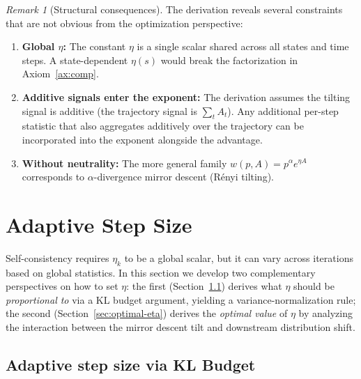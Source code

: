 \documentclass{article}
\theoremstyle{plain}
\theoremstyle{definition}
\theoremstyle{remark}
\newtheorem{remark}[theorem]{Remark}
\begin{document}
\begin{remark}[Structural consequences]
The derivation reveals several constraints that are not obvious from the optimization perspective:
\begin{enumerate}[label=(\roman*)]
  \item \textbf{Global $\eta$:} The constant $\eta$ is a single scalar shared across all states and time steps. A state-dependent $\eta(s)$ would break the factorization in Axiom~\ref{ax:comp}.
  \item \textbf{Additive signals enter the exponent:} The derivation assumes the tilting signal is additive (the trajectory signal is $\sum_t A_t$). Any additional per-step statistic that also aggregates additively over the trajectory can be incorporated into the exponent alongside the advantage.
  \item \textbf{Without neutrality:} The more general family $w(p,A) = p^\alpha e^{\eta A}$ corresponds to $\alpha$-divergence mirror descent (R\'enyi tilting).
\end{enumerate}
\end{remark}

\section{Adaptive Step Size}
\label{app:adaptive-eta}

Self-consistency requires $\eta_k$ to be a global scalar, but it can vary across iterations based on global statistics. In this section we develop two complementary perspectives on how to set $\eta$: the first (Section~\ref{sec:kl-budget}) derives what $\eta$ should be \emph{proportional to} via a KL budget argument, yielding a variance-normalization rule; the second (Section~\ref{sec:optimal-eta}) derives the \emph{optimal value} of $\eta$ by analyzing the interaction between the mirror descent tilt and downstream distribution shift.

\subsection{Adaptive step size via KL Budget}
\label{sec:kl-budget}
\end{document}
